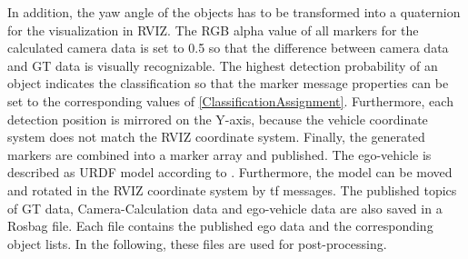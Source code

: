 In addition, the yaw angle of the objects has to be transformed into a quaternion for the visualization in \ac{RVIZ}. The RGB alpha value of all markers for the calculated camera data is set to 0.5 so that the difference between camera data and GT data is visually recognizable. 
The highest detection probability of an object indicates the classification so that the marker message properties can be set to the corresponding values of \cref{ClassificationAssignment}. Furthermore, each detection position is mirrored on the Y-axis, because the vehicle coordinate system does not match the \ac{RVIZ} coordinate system. Finally, the generated markers are combined into a marker array and published.
The ego-vehicle is described as URDF model according to \cite{URDF}.
Furthermore, the model can be moved and rotated in the \ac{RVIZ} coordinate system by tf messages. 
The published topics of \ac{GT} data, Camera-Calculation data and ego-vehicle data are also saved in a Rosbag file. Each file contains the published ego data and the corresponding object lists. In the following, these files are used for post-processing.
